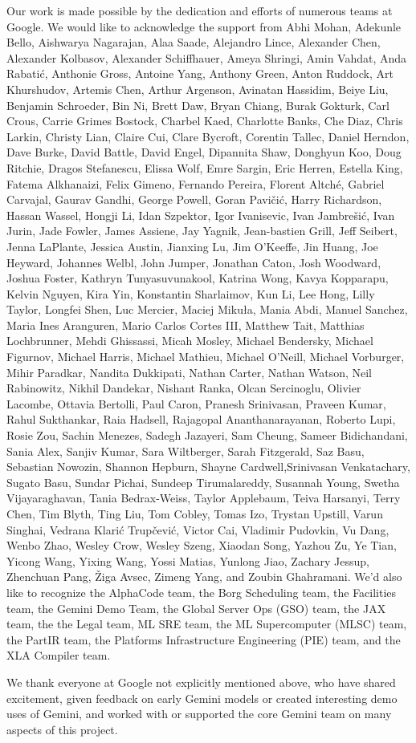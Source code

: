 Our work is made possible by the dedication and efforts of numerous teams at Google. We would like to acknowledge the support from Abhi Mohan, Adekunle Bello, Aishwarya Nagarajan, Alaa Saade, Alejandro Lince, Alexander Chen, Alexander Kolbasov, Alexander Schiffhauer, Ameya Shringi, Amin Vahdat, Anda Rabatić, Anthonie Gross, Antoine Yang, Anthony Green, Anton Ruddock, Art Khurshudov, Artemis Chen, Arthur Argenson, Avinatan Hassidim, Beiye Liu, Benjamin Schroeder, Bin Ni, Brett Daw, Bryan Chiang, Burak Gokturk, Carl Crous, Carrie Grimes Bostock, Charbel Kaed, Charlotte Banks, Che Diaz, Chris Larkin, Christy Lian, Claire Cui, Clare Bycroft, Corentin Tallec, Daniel Herndon, Dave Burke, David Battle, David Engel, Dipannita Shaw, Donghyun Koo, Doug Ritchie, Dragos Stefanescu, Elissa Wolf, Emre Sargin, Eric Herren, Estella King, Fatema Alkhanaizi, Felix Gimeno, Fernando Pereira, Florent Altché, Gabriel Carvajal, Gaurav Gandhi, George Powell, Goran Pavičić, Harry Richardson, Hassan Wassel, Hongji Li, Idan Szpektor, Igor Ivanisevic, Ivan Jambrešić, Ivan Jurin, Jade Fowler, James Assiene, Jay Yagnik, Jean-bastien Grill, Jeff Seibert, Jenna LaPlante, Jessica Austin, Jianxing Lu, Jim O'Keeffe, Jin Huang, Joe Heyward, Johannes Welbl, John Jumper, Jonathan Caton, Josh Woodward, Joshua Foster, Kathryn Tunyasuvunakool, Katrina Wong, Kavya Kopparapu, Kelvin Nguyen, Kira Yin, Konstantin Sharlaimov, Kun Li, Lee Hong, Lilly Taylor, Longfei Shen, Luc Mercier, Maciej Mikuła, Mania Abdi, Manuel Sanchez, Maria Ines Aranguren, Mario Carlos Cortes III, Matthew Tait, Matthias Lochbrunner, Mehdi Ghissassi, Micah Mosley, Michael Bendersky, Michael Figurnov, Michael Harris, Michael Mathieu, 
Michael O'Neill, Michael Vorburger, Mihir Paradkar, Nandita Dukkipati, Nathan Carter, Nathan Watson, Neil Rabinowitz, Nikhil Dandekar, Nishant Ranka, Olcan Sercinoglu, Olivier Lacombe, Ottavia Bertolli, Paul Caron, Pranesh Srinivasan, Praveen Kumar, Rahul Sukthankar, Raia Hadsell, Rajagopal Ananthanarayanan, Roberto Lupi, Rosie Zou, Sachin Menezes, Sadegh Jazayeri, Sam Cheung, Sameer Bidichandani, Sania Alex, Sanjiv Kumar, Sara Wiltberger, Sarah Fitzgerald, Saz Basu, Sebastian Nowozin, Shannon Hepburn, Shayne Cardwell,Srinivasan Venkatachary, Sugato Basu, Sundar Pichai, Sundeep Tirumalareddy, Susannah Young, Swetha Vijayaraghavan, Tania Bedrax-Weiss, Taylor Applebaum, Teiva Harsanyi, Terry Chen, Tim Blyth, Ting Liu, Tom Cobley, Tomas Izo, Trystan Upstill, Varun Singhai, Vedrana Klarić Trupčević, Victor Cai, Vladimir Pudovkin, Vu Dang, Wenbo Zhao, Wesley Crow, Wesley Szeng, Xiaodan Song, Yazhou Zu, Ye Tian, Yicong Wang, Yixing Wang, Yossi Matias, Yunlong Jiao, Zachary Jessup, Zhenchuan Pang,  Žiga Avsec, Zimeng Yang, and Zoubin Ghahramani. We'd also like to recognize the AlphaCode team, the Borg Scheduling team, the Facilities team, the Gemini Demo Team, the Global Server Ops (GSO) team, the JAX team, the the Legal team, ML SRE team, the ML Supercomputer (MLSC) team, the PartIR team, the Platforms Infrastructure Engineering (PIE) team, and the XLA Compiler team. 

We thank everyone at Google not explicitly mentioned above, who have shared excitement, given feedback on early Gemini models or created interesting demo uses of Gemini, and worked with or supported the core Gemini team on many aspects of this project.
